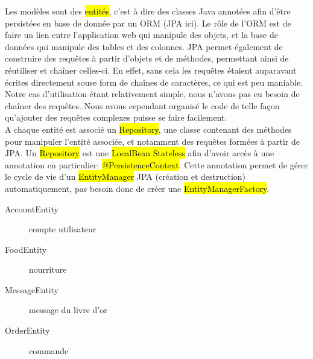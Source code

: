Les modèles sont des \hl{entités}, c'est à dire des classes Java annotées afin
d'être persistées en base de donnée par un ORM (JPA ici). Le rôle de l'ORM est
de faire un lien entre l'application web qui manipule des objets, et la base de
données qui manipule des tables et des colonnes. JPA permet également de
construire des requêtes à partir d'objets et de méthodes, permettant ainsi de
réutiliser et chaîner celles-ci. En effet, sans cela les requêtes étaient
auparavant écrites directement souse form de chaînes de caractères, ce qui est
peu maniable.\\

Notre cas d'utilisation étant relativement simple, nous n'avons pas eu besoin
de chaîner des requêtes. Nous avons cependant organisé le code de telle façon
qu'ajouter des requêtes complexes puisse se faire facilement.\\

A chaque entité est associé un \hl{Repository}, une classe contenant des méthodes
pour manipuler l'entité associée, et notamment des requêtes formées à partir
de JPA. Un \hl{Repository} est une \hl{LocalBean Stateless} afin d'avoir
accès à une annotation en particulier: \hl{@PersistenceContext}. Cette
annotation permet de gérer le cycle de vie d'un \hl{EntityManager} JPA
(création et destruction) automatiquement, pas besoin donc de créer une
\hl{EntityManagerFactory}.\\

\begin{description}
    \item[AccountEntity] compte utilisateur
    \item[FoodEntity] nourriture
    \item[MessageEntity] message du livre d'or
    \item[OrderEntity] commande
\end{description}
